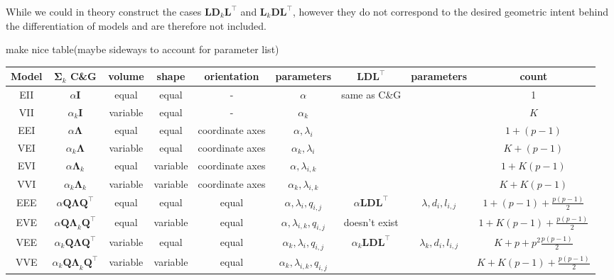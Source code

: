 While we could in theory construct the cases $\pmb{L}\pmb{D}_k\pmb{L}^\top$ and
$\pmb{L}_k \pmb{D} \pmb{L}^\top$, however they do not correspond to the desired
geometric intent behind the differentiation of models and are therefore not 
included.

make nice table(maybe sideways to account for parameter list)


\begin{table}[!htb]
    \centering
{}
{
    \begin{tabular}{| c | c c c c c | c c c |}
        \hline
        Model & $\pmb{\Sigma}_k$ C\&G & volume & shape & orientation & parameters & $ \pmb{LDL}^\top $ & parameters & count \\
        \hline

        EII    & $ \alpha \pmb{I} $ & equal & equal & - & $ \alpha $ & same as C\&G & & 1 \\
        VII    & $ \alpha_k \pmb{I} $         & variable & equal & - & $ \alpha_k $ & & & $K$  \\
        EEI    & $ \alpha \pmb{\Lambda} $     & equal & equal & coordinate axes & $ \alpha, \lambda_i $ & & & $ 1+(p-1) $\\
        VEI    & $ \alpha_k \pmb{\Lambda} $ & variable & equal & coordinate axes & $ \alpha_k, \lambda_{i}$ & & & $ K+(p-1) $ \\
        EVI    & $ \alpha \pmb{\Lambda}_k $ &equal & variable & coordinate axes & $ \alpha, \lambda_{i,k} $ & & & $ 1+K(p-1) $ \\
        VVI    & $ \alpha_k \pmb{\Lambda}_k $ & variable & variable & coordinate axes & $ \alpha_k, \lambda_{i,k} $ & & & $ K+K(p-1) $ \\
        \hline
        EEE    & $ \alpha \pmb{Q \Lambda Q}^\top $ &equal & equal & equal & $ \alpha, \lambda_{i}, q_{i,j} $ & $ \alpha \pmb{LDL}^{\top} $ & $ \lambda , d_i, l_{i,j} $ & $ 1+(p-1)+\frac{p(p-1)}{2} $ \\
        \hline
        EVE    & $ \alpha \pmb{Q \Lambda}_k \pmb{Q}^\top $ &equal & variable & equal & $ \alpha, \lambda_{i,k}, q_{i,j} $  & doesn't exist & & $ 1+K(p-1)+\frac{p(p-1)}{2} $ \\
        \hline
        VEE    & $ \alpha_k \pmb{Q \Lambda Q}^\top $ & variable & equal & equal & $ \alpha_k, \lambda_{i}, q_{i,j} $ & $ \alpha_k \pmb{LDL}^\top $ & $ \lambda_k , d_i, l_{i,j} $ & $ K+p+p^2\frac{p(p-1)}{2} $ \\
        \hline
        VVE    & $ \alpha_k \pmb{Q \Lambda}_k \pmb{Q}^\top $ &variable & variable & equal & $ \alpha_k, \lambda_{i,k}, q_{i,j} $ & & & $ K+K(p-1)+\frac{p(p-1)}{2} $ \\

\end{tabular}}
\end{table}
